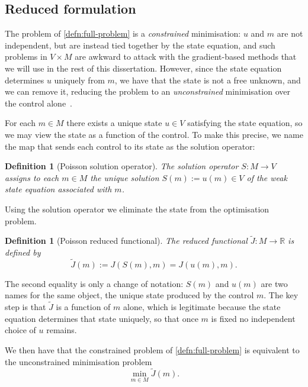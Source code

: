 \documentclass[a4paper,11pt]{article}
\newcommand{\R}{\mathbb{R}}
\newcommand{\Jt}{\tilde{J}}                  %
\newcommand{\Mspace}{M}
\theoremstyle{spacedplain} \newtheorem{theorem}[counter]{Theorem} \newtheorem{lemma}[counter]{Lemma} \newtheorem{prop}[counter]{Proposition} \newtheorem{cor}[counter]{Corollary}
\theoremstyle{spaceddefinition} \newtheorem{defn}[counter]{Definition} \newtheorem{example}[counter]{Example} \newtheorem{remark}[counter]{Remark}
\begin{document}
\subsection{Reduced formulation}
\label{sec:opt:reduced}

The problem of \cref{defn:full-problem} is a \emph{constrained} minimisation: $u$ and $m$ are not independent, but are instead tied together by the state equation, and such problems in $V \times \Mspace$ are awkward to attack with the gradient-based methods that we will use in the rest of this dissertation. However, since the state equation determines $u$ uniquely from $m$, we have that the state is not a free unknown, and we can remove it, reducing the problem to an \emph{unconstrained} minimisation over the control alone~\citep{shfp2017}.

For each $m \in \Mspace$ there exists a unique state $u \in V$ satisfying the state equation, so we may view the state as a function of the control. To make this precise, we name the map that sends each control to its state as the solution operator: 

\begin{defn}[Poisson solution operator]
\label{defn:solution-operator} The \emph{solution operator} $S : \Mspace \to V$ assigns to each $m \in \Mspace$ the unique solution $S(m) := u(m) \in V$ of the weak state equation associated with $m$.
\end{defn}

Using the solution operator we eliminate the state from the optimisation problem.

\begin{defn}[Poisson reduced functional]
\label{defn:reduced-functional} The \emph{reduced functional} $\Jt : \Mspace \to \R$ is defined by
\begin{equation}
  \Jt(m) := J(S(m), m) = J(u(m), m).
\end{equation}
\end{defn}

The second equality is only a change of notation: $S(m)$ and $u(m)$ are two names for the same object, the unique state produced by the control $m$. The key step is that $\Jt$ is a function of $m$ alone, which is legitimate because the state equation determines that state uniquely, so that once $m$ is fixed no independent choice of $u$ remains.

We then have that the constrained problem of \cref{defn:full-problem} is equivalent to the unconstrained minimisation problem
\begin{equation}
  \min_{m \in \Mspace} \Jt(m).
\end{equation}
\end{document}
